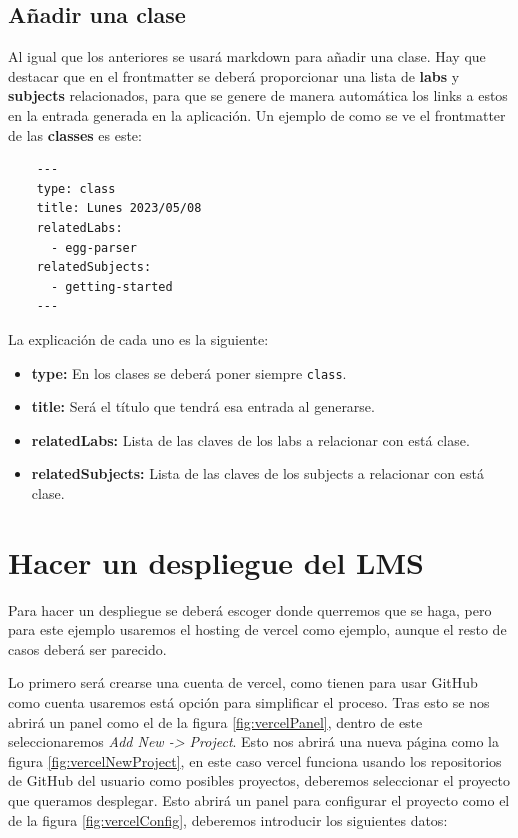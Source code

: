 \subsection{Añadir una clase}

Al igual que los anteriores se usará markdown para añadir una clase. Hay que destacar que en el frontmatter se deberá proporcionar una lista de \textbf{labs} y \textbf{subjects} relacionados, para que se genere de manera automática los links a estos en la entrada generada en la aplicación.
Un ejemplo de como se ve el frontmatter de las \textbf{classes} es este:

\begin{verbatim}
    ---
    type: class
    title: Lunes 2023/05/08
    relatedLabs:
      - egg-parser
    relatedSubjects:
      - getting-started
    ---
\end{verbatim}

La explicación de cada uno es la siguiente:

\begin{itemize}
    \item \textbf{type:} En los clases se deberá poner siempre \verb|class|.
    \item \textbf{title:} Será el título que tendrá esa entrada al generarse.
    \item \textbf{relatedLabs:} Lista de las claves de los labs a relacionar con está clase.
    \item \textbf{relatedSubjects:} Lista de las claves de los subjects a relacionar con está clase.
\end{itemize}

\section{Hacer un despliegue del LMS}

Para hacer un despliegue se deberá escoger donde querremos que se haga, pero para este ejemplo usaremos el hosting de vercel como ejemplo, aunque el resto de casos deberá ser parecido.

Lo primero será crearse una cuenta de vercel, como tienen para usar GitHub como cuenta usaremos está opción para simplificar el proceso. Tras esto se nos abrirá un panel como el de la figura \ref{fig:vercelPanel}, dentro de este seleccionaremos \textit{Add New -> Project}. Esto nos abrirá una nueva página como la figura \ref{fig:vercelNewProject}, en este caso vercel funciona usando los repositorios de GitHub del usuario como posibles proyectos, deberemos seleccionar el proyecto que queramos desplegar. Esto abrirá un panel para configurar el proyecto como el de la figura \ref{fig:vercelConfig}, deberemos introducir los siguientes datos:

